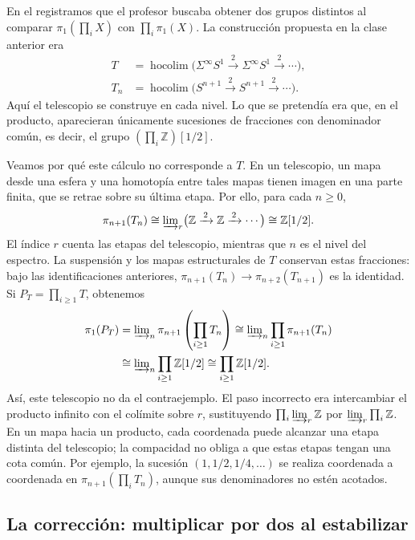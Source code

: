 En el  registramos que el profesor buscaba obtener dos grupos distintos al comparar $\pi_1(\prod_iX)$ con $\prod_i\pi_1(X)$. La construcción propuesta en la clase anterior era
\[
\begin{aligned}
T&=\operatorname{hocolim}\bigl(\Sigma^\infty S^1
\xrightarrow{\,2\,}\Sigma^\infty S^1
\xrightarrow{\,2\,}\cdots\bigr),\\
T_n&=\operatorname{hocolim}\bigl(S^{n+1}\xrightarrow{\,2\,}S^{n+1}\xrightarrow{\,2\,}\cdots\bigr).
\end{aligned}
\]
Aquí el telescopio se construye en cada nivel. Lo que se pretendía era que, en el producto, aparecieran únicamente sucesiones de fracciones con denominador común, es decir, el grupo $(\prod_i\mathbb Z)[1/2]$.

Veamos por qué este cálculo no corresponde a $T$. En un telescopio, un mapa desde una esfera y una homotopía entre tales mapas tienen imagen en una parte finita, que se retrae sobre su última etapa. Por ello, para cada $n\ge0$,
\[
\pi_{n+1}(T_n)\cong
\varinjlim\nolimits_r\bigl(\mathbb Z\xrightarrow{\,2\,}\mathbb Z\xrightarrow{\,2\,}\cdots\bigr)
\cong\mathbb Z[1/2].
\]
El índice $r$ cuenta las etapas del telescopio, mientras que $n$ es el nivel del espectro. La suspensión y los mapas estructurales de $T$ conservan estas fracciones: bajo las identificaciones anteriores, $\pi_{n+1}(T_n)\to\pi_{n+2}(T_{n+1})$ es la identidad. Si $P_T=\prod_{i\ge1}T$, obtenemos
\[
\begin{aligned}
\pi_1(P_T)
&=\varinjlim\nolimits_n\pi_{n+1}\left(\prod_{i\ge1}T_n\right)
\cong\varinjlim\nolimits_n\prod_{i\ge1}\pi_{n+1}(T_n)\\
&\cong\varinjlim\nolimits_n\prod_{i\ge1}\mathbb Z[1/2]
\cong\prod_{i\ge1}\mathbb Z[1/2].
\end{aligned}
\]
Así, este telescopio no da el contraejemplo. El paso incorrecto era intercambiar el producto infinito con el colímite sobre $r$, sustituyendo $\prod_i\varinjlim\nolimits_r\mathbb Z$ por $\varinjlim\nolimits_r\prod_i\mathbb Z$. En un mapa hacia un producto, cada coordenada puede alcanzar una etapa distinta del telescopio; la compacidad no obliga a que estas etapas tengan una cota común. Por ejemplo, la sucesión $(1,1/2,1/4,\ldots)$ se realiza coordenada a coordenada en $\pi_{n+1}(\prod_iT_n)$, aunque sus denominadores no estén acotados.

\subsection{La corrección: multiplicar por dos al estabilizar}

